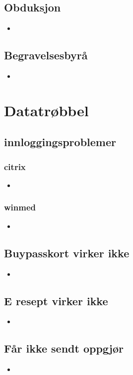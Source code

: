 \begin{itemize}
	\section{Obduksjon}
		\begin{itemize}
			\item
		\end{itemize}
	\section{Begravelsesbyrå}
		\begin{itemize}
			\item
		\end{itemize}

\newpage
\chapter{Datatrøbbel}
	\section{innloggingsproblemer}
		\subsection{citrix}
			\begin{itemize}
				\item
			\end{itemize}
		\subsection{winmed}
			\begin{itemize}
				\item
			\end{itemize}
	\section{Buypasskort virker ikke}
		\begin{itemize}
			\item
		\end{itemize}
	\section{E resept virker ikke}
		\begin{itemize}
			\item
		\end{itemize}
	\section{Får ikke sendt oppgjør}
		\begin{itemize}
			\item
		\end{itemize}

\end{itemize}
